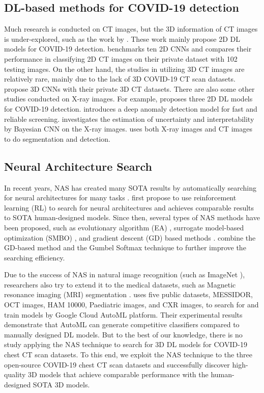 \documentclass[letterpaper]{article}
\begin{document}
\subsection{DL-based methods for COVID-19 detection}
Much research is conducted on CT images, but the 3D information of CT images is under-explored, such as the work by \cite{He2020,Mobiny2020,Singh2020}. These work mainly propose 2D DL models for COVID-19 detection. \cite{Ardakani2020} benchmarks ten 2D CNNs and compares their performance in classifying 2D CT images on their private dataset with 102 testing images. On the other hand, the studies in utilizing 3D CT images are relatively rare, mainly due to the lack of 3D COVID-19 CT scan datasets. \cite{li2020artificial,Zheng2020} propose 3D CNNs with their private 3D CT datasets. There are also some other studies conducted on X-ray images. For example, \cite{Narin2020} proposes three 2D DL models for COVID-19 detection. \cite{Zhang2020} introduces a deep anomaly detection model for fast and reliable screening. \cite{Ghoshal2020} investigates the estimation of uncertainty and interpretability by Bayesian CNN on the X-ray images. \cite{Alom} uses both X-ray images and CT images to do segmentation and detection.

\subsection{Neural Architecture Search}
In recent years, NAS has created many SOTA results by automatically searching for neural architectures for many tasks \cite{automl_survey,nas_survey}. \cite{nas2016,nasnet_zoph17} first propose to use reinforcement learning (RL) to search for neural architectures and achieves comparable results to SOTA human-designed models. Since then, several types of NAS methods have been proposed, such as evolutionary
algorithm (EA) \cite{amoebanet}, surrogate model-based optimization (SMBO) \cite{pnas_liu18}, and gradient descent (GD) based methods \cite{darts,gdas}. \cite{gdas,fbnet} combine the GD-based method and the Gumbel Softmax \cite{Gumbel_Softmax} technique to further improve the searching efficiency.

Due to the success of NAS in natural image recognition (such as ImageNet \cite{deng2009imagenet}), researchers also try to extend it to the medical datasets, such as Magnetic resonance imaging (MRI) segmentation \cite{scalableNAS}. \cite{Faes2019} uses five public datasets, MESSIDOR, OCT images, HAM 10000, Paediatric images, and CXR images, to search for and train models by Google Cloud AutoML platform. Their experimental results demonstrate that AutoML can generate competitive classifiers compared to manually designed DL models. But to the best of our knowledge, there is no study applying the NAS technique to search for 3D DL models for COVID-19 chest CT scan datasets. To this end, we exploit the NAS technique to the three open-source COVID-19 chest CT scan datasets and successfully discover high-quality 3D models that achieve comparable performance with the human-designed SOTA 3D models.
\end{document}
